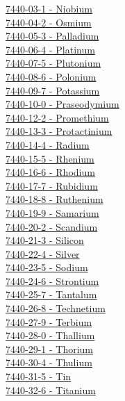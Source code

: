 \documentclass{book}
\begin{document}
\begin{multicols}{2}
\hyperref[sec:elem-niobium]{7440-03-1 - Niobium}\\
\hyperref[sec:elem-osmium]{7440-04-2 - Osmium}\\
\hyperref[sec:elem-palladium]{7440-05-3 - Palladium}\\
\hyperref[sec:elem-platinum]{7440-06-4 - Platinum}\\
\hyperref[sec:elem-plutonium]{7440-07-5 - Plutonium}\\
\hyperref[sec:elem-polonium]{7440-08-6 - Polonium}\\
\hyperref[sec:elem-potassium]{7440-09-7 - Potassium}\\
\hyperref[sec:elem-praseodymium]{7440-10-0 - Praseodymium}\\
\hyperref[sec:elem-promethium]{7440-12-2 - Promethium}\\
\hyperref[sec:elem-protactinium]{7440-13-3 - Protactinium}\\
\hyperref[sec:elem-radium]{7440-14-4 - Radium}\\
\hyperref[sec:elem-rhenium]{7440-15-5 - Rhenium}\\
\hyperref[sec:elem-rhodium]{7440-16-6 - Rhodium}\\
\hyperref[sec:elem-rubidium]{7440-17-7 - Rubidium}\\
\hyperref[sec:elem-ruthenium]{7440-18-8 - Ruthenium}\\
\hyperref[sec:elem-samarium]{7440-19-9 - Samarium}\\
\hyperref[sec:elem-scandium]{7440-20-2 - Scandium}\\
\hyperref[sec:elem-silicon]{7440-21-3 - Silicon}\\
\hyperref[sec:elem-silver]{7440-22-4 - Silver}\\
\hyperref[sec:elem-sodium]{7440-23-5 - Sodium}\\
\hyperref[sec:elem-strontium]{7440-24-6 - Strontium}\\
\hyperref[sec:elem-tantalum]{7440-25-7 - Tantalum}\\
\hyperref[sec:elem-technetium]{7440-26-8 - Technetium}\\
\hyperref[sec:elem-terbium]{7440-27-9 - Terbium}\\
\hyperref[sec:elem-thallium]{7440-28-0 - Thallium}\\
\hyperref[sec:elem-thorium]{7440-29-1 - Thorium}\\
\hyperref[sec:elem-thulium]{7440-30-4 - Thulium}\\
\hyperref[sec:elem-tin]{7440-31-5 - Tin}\\
\hyperref[sec:elem-titanium]{7440-32-6 - Titanium}\\

\end{multicols}
\end{document}
